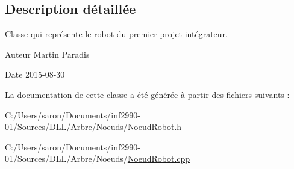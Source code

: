 \subsection{Description détaillée}
Classe qui représente le robot du premier projet intégrateur. 

\begin{DoxyAuthor}{Auteur}
Martin Paradis 
\end{DoxyAuthor}
\begin{DoxyDate}{Date}
2015-\/08-\/30 
\end{DoxyDate}


La documentation de cette classe a été générée à partir des fichiers suivants \-:\begin{DoxyCompactItemize}
\item 
C\-:/\-Users/saron/\-Documents/inf2990-\/01/\-Sources/\-D\-L\-L/\-Arbre/\-Noeuds/\hyperlink{_noeud_robot_8h}{Noeud\-Robot.\-h}\item 
C\-:/\-Users/saron/\-Documents/inf2990-\/01/\-Sources/\-D\-L\-L/\-Arbre/\-Noeuds/\hyperlink{_noeud_robot_8cpp}{Noeud\-Robot.\-cpp}\end{DoxyCompactItemize}
